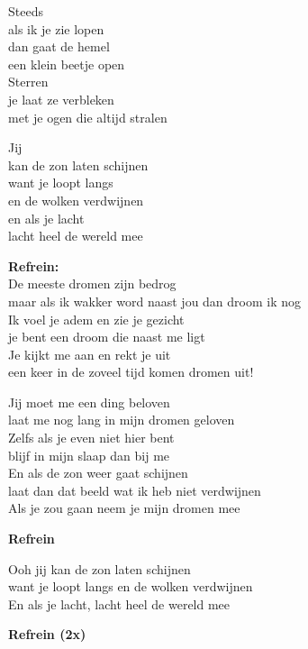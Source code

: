 Steeds\\
als ik je zie lopen\\
dan gaat de hemel\\
een klein beetje open\\
Sterren\\
je laat ze verbleken\\
met je ogen die altijd stralen

Jij\\
kan de zon laten schijnen\\
want je loopt langs\\
en de wolken verdwijnen\\
en als je lacht\\
lacht heel de wereld mee

\textbf{Refrein:}\\
De meeste dromen zijn bedrog\\
maar als ik wakker word naast jou dan droom ik nog\\
Ik voel je adem en zie je gezicht\\
je bent een droom die naast me ligt\\
Je kijkt me aan en rekt je uit\\
een keer in de zoveel tijd komen dromen uit!

Jij moet me een ding beloven\\
laat me nog lang in mijn dromen geloven\\
Zelfs als je even niet hier bent\\
blijf in mijn slaap dan bij me\\
En als de zon weer gaat schijnen\\
laat dan dat beeld wat ik heb niet verdwijnen\\
Als je zou gaan neem je mijn dromen mee

\textbf{Refrein}

Ooh jij kan de zon laten schijnen\\
want je loopt langs en de wolken verdwijnen\\
En als je lacht, lacht heel de wereld mee

\textbf{Refrein (2x)}
